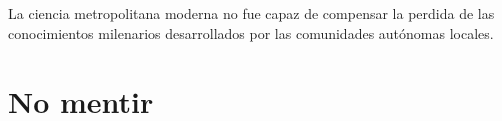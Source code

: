 \documentclass[a4paper,10pt]{book}
\newif\ifes
\newcommand{\es}[1]{\ifes#1\fi}
\begin{document}

\es{La pérdida de biodiversidad actual está precedida por la pérdida de diversidad cultural.}%
%
\es{A pesar de todos los avances científicos, la masiva pérdida de conocimiento cultural trajo como consecuencia una crisis ecológica sin precedentes.}%
%
La ciencia metropolitana moderna no fue capaz de compensar la perdida de las conocimientos milenarios desarrollados por las comunidades autónomas locales.
%
\es{La re-adaptación ecológica requiere recuperar las autonomías comunitarias perdidas en el proceso colonial-moderno~\cite{segato2013}.}%
%
\es{A través de pluralismo histórico\cite{segato2013}, de una gobernanza policéntrica\cite{ostrom}, se podrá recuperar el proceso de evolución cultural, fuente de la inteligencia de nuestra especie.}%

\section{No mentir}

% 
% 
% 
% 
\end{document}
